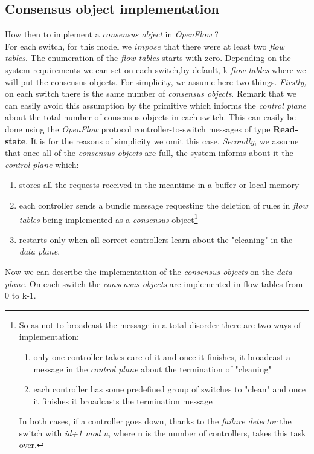 \documentclass{article}
\theoremstyle{remark}
\begin{document}
\subsection{Consensus object implementation}
How then to implement a \emph{consensus object} in \emph{OpenFlow} ? \\
For each switch, for this model we $impose$ that there were at least two \emph{flow tables}. The enumeration of the \emph{flow tables} starts with zero. Depending on the system requirements we can set on each switch,by default, k \emph{flow tables} where we will put the consensus objects. For simplicity, we assume here two things. \emph{Firstly,} on each switch there is the same number of \emph{consensus objects}. Remark that we can easily avoid this assumption by the primitive which informs the \emph{control plane} about the total number of consensus objects in each switch. This can easily be done using the \emph{OpenFlow} protocol controller-to-switch messages of type \textbf{Read-state}. It is for the reasons of simplicity we omit this case. \emph{Secondly,} we assume that once all of the \emph{consensus objects} are full, the system informs about it the \emph{control plane} which:
\begin{enumerate}
\item stores all the requests received in the meantime in a buffer or local memory
\item each controller sends a bundle message requesting the deletion of rules in \emph{flow tables} being implemented as a \emph{consensus} object\footnote{So as not to broadcast the message in a total disorder there are two ways of implementation:
\begin{enumerate}
\item only one controller takes care of it and once it finishes, it broadcast a message in the \emph{control plane} about the termination of "cleaning"
\item each controller has some predefined group of switches to "clean" and once it finishes it broadcasts the termination message
\end{enumerate}
In both cases, if a controller goes down, thanks to the \emph{failure detector} the switch with \emph{id+1 mod n}, where n is the number of controllers, takes this task over.}
\item restarts only when all correct controllers learn about the "cleaning" in the \emph{data plane}. 
\end{enumerate}
Now we can describe the implementation of the \emph{consensus objects} on the \emph{data plane}. On each switch the \emph{consensus objects} are implemented in flow tables from 0 to k-1.
\end{document}
